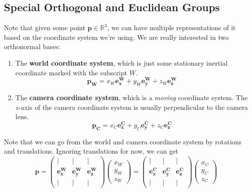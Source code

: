 \documentclass{article}
\begin{document}
  \subsection{Special Orthogonal and Euclidean Groups}
  Note that given some point $\mathbf{p} \in \mathbb{R}^3$, we can have multiple representations of it based on the coordinate system we're using. We are really interested in two orthonormal bases: 
  \begin{enumerate}
      \item The \textbf{world coordinate system}, which is just some stationary inertial coordinate marked with the subscript $W$. 
      \begin{equation}
        \mathbf{p_W} = x_W \mathbf{e_x^W} + y_W \mathbf{e_y^W} + z_W \mathbf{e_z^W}
      \end{equation}
       
      
      \item The \textbf{camera coordinate system}, which is a \textit{moving} coordinate system. The $z$-axis of the camera coordinate system is usually perpendicular to the camera lens. 
      \begin{equation}
        \mathbf{p_C} = x_C \mathbf{e_x^C} + y_C \mathbf{e_y^C} + z_C \mathbf{e_z^C}
      \end{equation}
       
  \end{enumerate}
  Note that we can go from the world and camera coordinate system by rotations and translations. Ignoring translations for now, we can get 
  \begin{equation}
    \mathbf{p} = \begin{pmatrix} | & | & | \\ \mathbf{e_x^W} & \mathbf{e_y^W} & \mathbf{e_z^W} \\ | & | & | \end{pmatrix} \begin{pmatrix} x_W \\ y_W \\ z_W \end{pmatrix} = \begin{pmatrix} | & | & | \\ \mathbf{e_x^C} & \mathbf{e_y^C} & \mathbf{e_z^C} \\ | & | & | \end{pmatrix} \begin{pmatrix} x_C \\ y_C \\ z_C \end{pmatrix}
  \end{equation}
\end{document}
